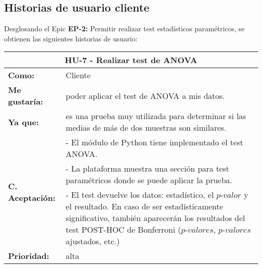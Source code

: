 \subsection{Historias de usuario cliente}


Desglosando el Epic \textbf{EP-2:} Permitir realizar test estadísticos paramétricos, se obtienen las siguientes historias de usuario:

\begin{table}[H]
	\begin{tabular}{| p{3cm}| p{11cm} |}
		\hline
		\multicolumn{2}{|c|}{\textbf{HU-7} - Realizar test de ANOVA} \\ \hline
		\textbf{Como:} & Cliente \\ \hline
		\textbf{Me gustaría:} & poder aplicar el test de ANOVA a mis datos. \\ \hline
		\textbf{Ya que:} & es una prueba muy utilizada para determinar si las medias de más de dos muestras son similares. \\ \hline
		\multirow{3}{11cm}{\textbf{C. Aceptación:}} & - El módulo de Python tiene implementado el test ANOVA. \\
		& - La plataforma muestra una sección para test paramétricos donde se puede aplicar la prueba. \\
		& - El test devuelve los datos: estadístico, el $\textit{p-valor}$ y el resultado. En caso de ser estadísticamente significativo, también aparecerán los resultados del test POST-HOC de Bonferroni ($\textit{p-valores}$, $\textit{p-valores}$ ajustados, etc.) \\ \hline
		\textbf{\textbf{Prioridad:}} & alta \\ \hline
	\end{tabular}
\end{table}


